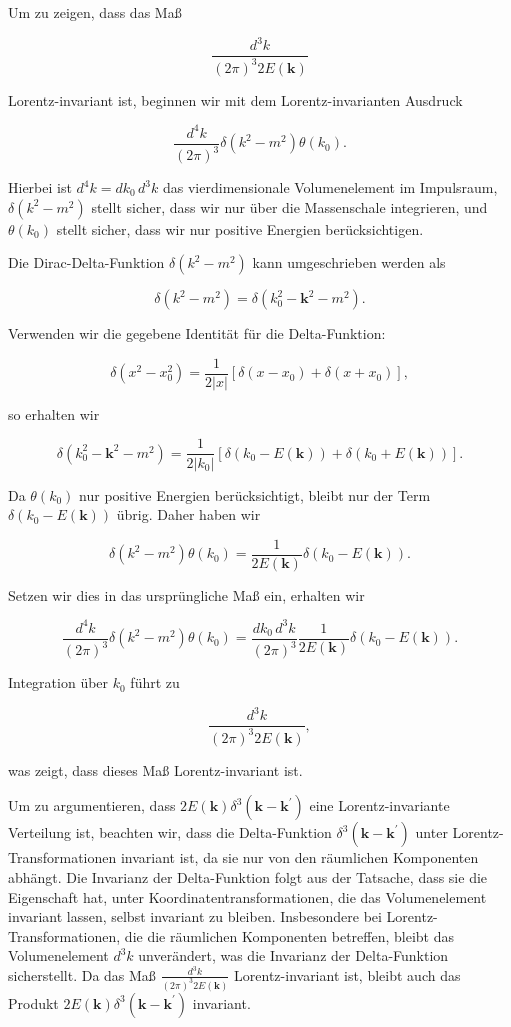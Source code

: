 Um zu zeigen, dass das Maß 

\[
\frac{d^3 k}{(2 \pi)^3 2 E(\mathbf{k})}
\]

Lorentz-invariant ist, beginnen wir mit dem Lorentz-invarianten Ausdruck 

\[
\frac{d^4 k}{(2 \pi)^3} \delta\left(k^2 - m^2\right) \theta\left(k_0\right).
\]

Hierbei ist $d^4 k = dk_0 \, d^3 k$ das vierdimensionale Volumenelement im Impulsraum, $\delta\left(k^2 - m^2\right)$ stellt sicher, dass wir nur über die Massenschale integrieren, und $\theta\left(k_0\right)$ stellt sicher, dass wir nur positive Energien berücksichtigen.

Die Dirac-Delta-Funktion $\delta\left(k^2 - m^2\right)$ kann umgeschrieben werden als 

\[
\delta\left(k^2 - m^2\right) = \delta\left(k_0^2 - \mathbf{k}^2 - m^2\right).
\]

Verwenden wir die gegebene Identität für die Delta-Funktion:

\[
\delta\left(x^2 - x_0^2\right) = \frac{1}{2|x|}\left[\delta\left(x - x_0\right) + \delta\left(x + x_0\right)\right],
\]

so erhalten wir

\[
\delta\left(k_0^2 - \mathbf{k}^2 - m^2\right) = \frac{1}{2|k_0|} \left[\delta\left(k_0 - E(\mathbf{k})\right) + \delta\left(k_0 + E(\mathbf{k})\right)\right].
\]

Da $\theta(k_0)$ nur positive Energien berücksichtigt, bleibt nur der Term $\delta\left(k_0 - E(\mathbf{k})\right)$ übrig. Daher haben wir

\[
\delta\left(k^2 - m^2\right) \theta\left(k_0\right) = \frac{1}{2E(\mathbf{k})} \delta\left(k_0 - E(\mathbf{k})\right).
\]

Setzen wir dies in das ursprüngliche Maß ein, erhalten wir

\[
\frac{d^4 k}{(2 \pi)^3} \delta\left(k^2 - m^2\right) \theta\left(k_0\right) = \frac{dk_0 \, d^3 k}{(2 \pi)^3} \frac{1}{2E(\mathbf{k})} \delta\left(k_0 - E(\mathbf{k})\right).
\]

Integration über $k_0$ führt zu

\[
\frac{d^3 k}{(2 \pi)^3 2E(\mathbf{k})},
\]

was zeigt, dass dieses Maß Lorentz-invariant ist.

Um zu argumentieren, dass $2 E(\mathbf{k}) \delta^3\left(\mathbf{k} - \mathbf{k}^{\prime}\right)$ eine Lorentz-invariante Verteilung ist, beachten wir, dass die Delta-Funktion $\delta^3\left(\mathbf{k} - \mathbf{k}^{\prime}\right)$ unter Lorentz-Transformationen invariant ist, da sie nur von den räumlichen Komponenten abhängt. Die Invarianz der Delta-Funktion folgt aus der Tatsache, dass sie die Eigenschaft hat, unter Koordinatentransformationen, die das Volumenelement invariant lassen, selbst invariant zu bleiben. Insbesondere bei Lorentz-Transformationen, die die räumlichen Komponenten betreffen, bleibt das Volumenelement $d^3 k$ unverändert, was die Invarianz der Delta-Funktion sicherstellt. Da das Maß $\frac{d^3 k}{(2 \pi)^3 2 E(\mathbf{k})}$ Lorentz-invariant ist, bleibt auch das Produkt $2 E(\mathbf{k}) \delta^3\left(\mathbf{k} - \mathbf{k}^{\prime}\right)$ invariant.